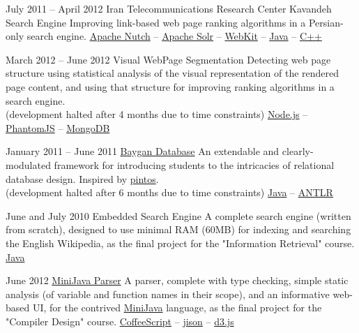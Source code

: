 \documentclass{tccv}
\begin{document}
\begin{project_list}

\item{July 2011 -- April 2012}
     {Iran Telecommunications Research Center}
     {Kavandeh Search Engine}
	 {Improving link-based web page ranking algorithms in a Persian-only search engine.}
     {
     	\href{http://nutch.apache.org}{Apache Nutch} -- 
		\href{http://lucene.apache.org/solr/}{Apache Solr} -- 
		\href{http://www.webkit.org}{WebKit} -- 
		\href{http://www.oracle.com/technetwork/java/}{Java} -- 
		\href{https://en.wikipedia.org/wiki/C\%2B\%2B}{C++}
	}



\item{March 2012 -- June 2012}
     {}
     {Visual WebPage Segmentation}
	 {Detecting web page structure using statistical analysis of the visual representation of the rendered page content, and using that structure for improving ranking algorithms in a search engine.\\
(development halted after 4 months due to time constraints)}
	 {
	 	\href{http://nodejs.org}{Node.js} -- 
		\href{http://phantomjs.org}{PhantomJS} -- 
		\href{http://www.mongodb.org}{MongoDB}
	 }



\item{January 2011 -- June 2011}
	 {}
	 {\href{https://github.com/baygan/Baygan}{Baygan Database}}
	 {An extendable and clearly-modulated framework for introducing students to the intricacies of relational database design. Inspired by \href{http://www.stanford.edu/class/cs140/projects/pintos/pintos.html}{pintos}.\\
(development halted after 6 months due to time constraints)}
	 {
	 	\href{http://www.oracle.com/technetwork/java/}{Java} -- 
		\href{http://www.antlr.org}{ANTLR}
	 }
	 
	 
	 
\item{June and July 2010}
	 {}
	 {Embedded Search Engine}
	 {A complete search engine (written from scratch), designed to use minimal RAM (60MB) for indexing and searching the English Wikipedia, as the final project for the "Information Retrieval" course.}
	 {
		 \href{http://www.oracle.com/technetwork/java/}{Java}
	 }



\item{June 2012}
	 {}
	 {\href{https://github.com/pooriaazimi/Mini-Java}{MiniJava Parser}}
	 {A parser, complete with type checking, simple static analysis (of variable and function names in their scope), and an informative web-based UI, for the contrived \href{http://www.cambridge.org/resources/052182060X/MCIIJ2e/grammar.htm}{MiniJava} language, as the final project for the "Compiler Design" course.}
	 {
		 \href{http://coffeescript.org}{CoffeeScript} -- 
		 \href{http://zaach.github.io/jison/}{jison} -- 
		 \href{http://d3js.org}{d3.js}
	 }




\end{project_list}
\end{document}
